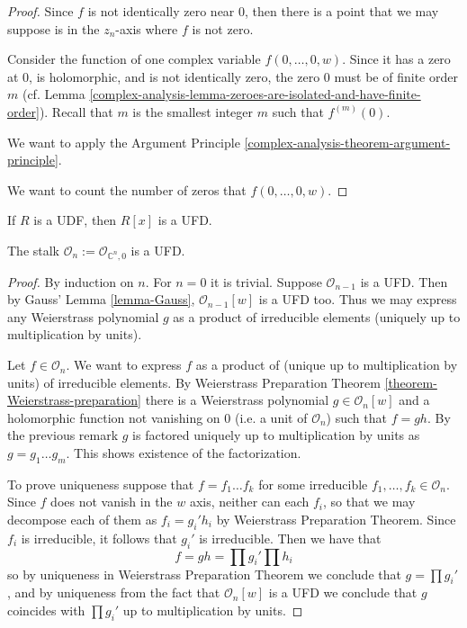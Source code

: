 \begin{proof}

Since $f$ is not identically zero near $0$, then there is a point that we may
suppose is in the $z_n$-axis where $f$ is not zero.

Consider the function of one complex variable $f(0,\ldots,0,w)$. Since it has a
zero at $0$, is holomorphic, and is not identically zero, the zero $0$ must be
of finite order $m$ (cf. Lemma
\ref{complex-analysis-lemma-zeroes-are-isolated-and-have-finite-order}). Recall
that $m$ is the smallest integer $m$ such that $f^{(m)}(0)$.

We want to apply the Argument Principle
\ref{complex-analysis-theorem-argument-principle}.

We want to count the number of zeros that $f(0,…,0,w)$.

\end{proof}

\begin{lemma}
\label{lemma-Gauss-UFD}
If $R$ is a UDF, then $R[x]$ is a UFD.
\end{lemma}

\begin{lemma}
\label{lemma-stalk-is-UFD}
The stalk $\mathcal{O}_n:=\mathcal{O}_{\mathbb{C}^n,0}$ is a UFD.
\end{lemma}

\begin{proof}
By induction on $n$. For $n=0$ it is trivial. Suppose $\mathcal{O}_{n-1}$ is a
UFD. Then by Gauss' Lemma \ref{lemma-Gauss}, $\mathcal{O}_{n-1}[w]$ is a UFD
too. Thus we may express any Weierstrass polynomial $g$ as a product of
irreducible elements (uniquely up to multiplication by units).

Let $f\in \mathcal{O}_n$. We want to express $f$ as a product of (unique up to
multiplication by units) of irreducible elements. By Weierstrass Preparation
Theorem \ref{theorem-Weierstrass-preparation} there is a Weierstrass polynomial
$g\in\mathcal{O}_n[w]$ and a holomorphic function not vanishing on $0$ (i.e. a
unit of $\mathcal{O}_n$) such that $f=gh$. By the previous remark $g$ is
factored uniquely up to multiplication by units as $g=g_1\ldots g_m$. This shows
existence of the factorization.

To prove uniqueness suppose that $f=f_1\ldots f_k$ for some irreducible
$f_1,\ldots,f_k\in\mathcal{O}_n$. Since $f$ does not vanish in the $w$ axis,
neither can each $f_i$, so that we may decompose each of them as  $f_i=g_i'h_i$
by Weierstrass Preparation Theorem. Since $f_i$ is irreducible, it follows that
$g_i'$ is irreducible. Then we have that $$ f=gh=\prod g_i'\prod h_i $$ so by
uniqueness in Weierstrass Preparation Theorem we conclude that $g=\prod g_i'$,
and by uniqueness from the fact that  $\mathcal{O}_n[w]$ is a UFD we conclude
that $g$ coincides with $\prod g_i'$ up to multiplication by units.
\end{proof}

